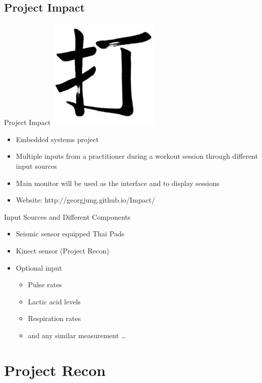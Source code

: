 \documentclass{beamer}
\begin{document}
\subsection{Project Impact}

 \begin{frame}{Project Impact}
\includegraphics[scale=0.2]{Da.png}  
\begin{itemize}
   \item
    Embedded systems project
   \item
    Multiple inputs from a practitioner during a workout session through different input sources
   \item
    Main monitor will be used as the interface and to display sessions
   \item Website: http://georgjung.github.io/Impact/
  \end{itemize}
 \end{frame}

\begin{frame}{Input Sources and Different Components}
 \begin{itemize}
  \item
   Seismic sensor equipped Thai Pads
  \item
    Kinect sensor (Project Recon)
  \item Optional input
  \begin{itemize}
   \item Pulse rates
   \item Lactic acid levels
   \item Respiration rates
   \item and any similar measurement \dots
  \end{itemize}
 \end{itemize}
\end{frame}

\section{Project Recon}
\end{document}

